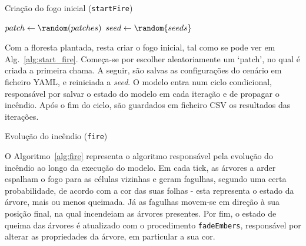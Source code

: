 \begin{algorithm}
    \caption{Criação do fogo inicial (\texttt{startFire})}\label{alg:start_fire}
    $patch \gets \random(patches)$\;
    \;
    \saveConfig{}\;
    $seed \gets \random{seeds}$\;
    \While{\anyTreesBurning{}}{
        \saveIteration{}\;
        \fire{}\;
    }
    \saveIterations{}\;
\end{algorithm}

Com a floresta plantada, resta criar o fogo inicial, tal como se pode ver em Alg.~\ref{alg:start_fire}.
Começa-se por escolher aleatoriamente um ‘patch’, no qual é criada a primeira chama.
A seguir, são salvas as configurações do cenário em ficheiro YAML, e reiniciada a \textit{seed}.
O modelo entra num ciclo condicional, responsável por salvar o estado do modelo em cada iteração e de propagar o incêndio.
Após o fim do ciclo, são guardados em ficheiro CSV os resultados das iterações.


\begin{algorithm}
    \caption{Evolução do incêndio (\texttt{fire})}\label{alg:fire}
\fadeEmbers{}\;
\tick{}\;
\end{algorithm}

O Algoritmo~\ref{alg:fire} representa o algoritmo responsável pela evolução do incêndio ao longo da execução do modelo. Em cada tick, as árvores a arder espalham o fogo para as células vizinhas e geram fagulhas, segundo uma certa probabilidade, de acordo com a cor das suas folhas - esta representa o estado da árvore, mais ou menos queimada. Já as fagulhas movem-se em direção à sua posição final, na qual incendeiam as árvores presentes. Por fim, o estado de queima das árvores é atualizado com o procedimento \texttt{fadeEmbers}, responsável por alterar as propriedades da árvore, em particular a sua cor.

